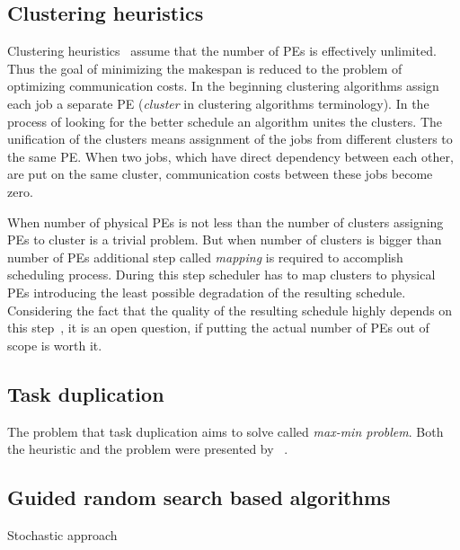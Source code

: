 \subsection{Clustering heuristics}
\label{sec:clustering}


Clustering
heuristics~\cite{singh2008workflow,liou1996efficient,kwok1999static,gerasoulis1992comparison,mahjoub2011computational}
assume that the number of PEs is effectively unlimited. Thus the goal
of minimizing the makespan is reduced to the problem of optimizing
communication costs. In the beginning clustering algorithms assign
each job a separate PE (\emph{cluster} in clustering algorithms
terminology). In the process of looking for the better schedule an
algorithm unites the clusters. The unification of the clusters means
assignment of the jobs from different clusters to the same PE. When
two jobs, which have direct dependency between each other, are put on
the same cluster, communication costs between these jobs become zero.

When number of physical PEs is not less than the number of clusters
assigning PEs to cluster is a trivial problem. But when number of
clusters is bigger than number of PEs additional step called
\emph{mapping} is required to accomplish scheduling process. During
this step scheduler has to map clusters to physical PEs introducing
the least possible degradation of the resulting schedule. Considering
the fact that the quality of the resulting schedule highly depends on
this step~\cite{kwok1999static}, it is an open question,
if putting the actual number of PEs out of scope is worth it.

\subsection{Task duplication}
\label{sec:duplication}

The problem that task duplication aims to solve called \emph{max-min
  problem}. Both the heuristic and the problem were presented
by \citeauthor{kruatrachue1987static}~\cite{kruatrachue1987static}.

\cite{shin2008task}

\subsection{Guided random search based algorithms}
\label{sec:random}

Stochastic approach~\cite{zheng20131673,grajcar1999genetic}

